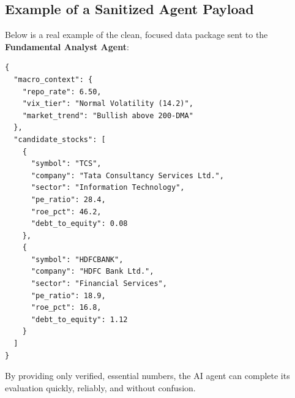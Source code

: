 \subsection{Example of a Sanitized Agent Payload}
Below is a real example of the clean, focused data package sent to the \textbf{Fundamental Analyst Agent}:

\begin{footnotesize}
\begin{verbatim}
{
  "macro_context": {
    "repo_rate": 6.50,
    "vix_tier": "Normal Volatility (14.2)",
    "market_trend": "Bullish above 200-DMA"
  },
  "candidate_stocks": [
    {
      "symbol": "TCS",
      "company": "Tata Consultancy Services Ltd.",
      "sector": "Information Technology",
      "pe_ratio": 28.4,
      "roe_pct": 46.2,
      "debt_to_equity": 0.08
    },
    {
      "symbol": "HDFCBANK",
      "company": "HDFC Bank Ltd.",
      "sector": "Financial Services",
      "pe_ratio": 18.9,
      "roe_pct": 16.8,
      "debt_to_equity": 1.12
    }
  ]
}
\end{verbatim}
\end{footnotesize}

By providing only verified, essential numbers, the AI agent can complete its evaluation quickly, reliably, and without confusion.
